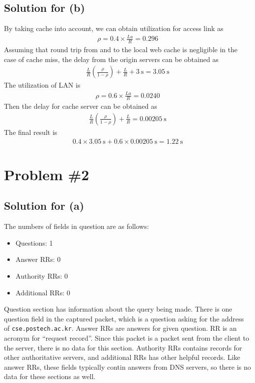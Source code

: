 \documentclass{scrartcl}
\newcommand{\un}[1]{\ensuremath{\ \mathrm{#1}}}
\begin{document}
\subsection{Solution for (b)}
By taking cache into account, we can obtain utilization for access link as
\begin{align*} 
  \rho = 0.4 \times \frac{La}{R} = 0.296
\end{align*}
Assuming that round trip from and to the local web cache is negligible in the
case of cache miss, the delay from the origin servers can be obtained as
\begin{align*}
  \frac{L}{R} \left( \frac{\rho}{1 - \rho} \right) + \frac{L}{R} + 3 \un{s}
  = 3.05 \un{s}
\end{align*}
The utilization of LAN is
\begin{align*}
  \rho = 0.6 \times \frac{La}{R} = 0.0240
\end{align*}
Then the delay for cache server can be obtained as
\begin{align*}
  \frac{L}{R} \left( \frac{\rho}{1 - \rho} \right) + \frac{L}{R}
  = 0.00205 \un{s}
\end{align*}
The final result is
\begin{align*}
  0.4 \times 3.05 \un{s} + 0.6 \times 0.00205 \un{s} = 1.22 \un{s}
\end{align*}

\section{Problem \#2}

\subsection{Solution for (a)}
The numbers of fields in question are as follows:

\begin{itemize}
  \item Questions: 1
  \item Answer RRs: 0
  \item Authority RRs: 0
  \item Additional RRs: 0
\end{itemize}

Question section has information about the query being made. There is one
question field in the captured packet, which is a question asking for the
address of \texttt{cse.postech.ac.kr}. Answer RRs are answers for given
question. RR is an acronym for ``request record''. Since this packet is a
packet sent from the client to the server, there is no data for this section.
Authority RRs contains records for other authoritative servers, and additional
RRs has other helpful records. Like answer RRs, these fields typically contin
answers from DNS servers, so there is no data for these sections as well.
\end{document}
